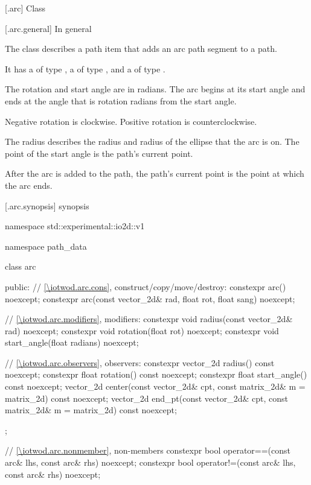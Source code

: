  [\iotwod.arc] {Class }

 [\iotwod.arc.general] {In general}

\pnum
{}%
The class  describes a path item that adds an arc path segment to a path.

\pnum
It has a  of type , a  of type , and a  of type .

\pnum
The rotation and start angle are in radians. The arc begins at its start angle and ends at the angle that is rotation radians from the start angle.

\pnum
\begin{note}
Negative rotation is clockwise. Positive rotation is counterclockwise.
\end{note}

\pnum
The radius describes the \xaxis radius and \yaxis radius of the ellipse that the arc is on. The point of the start angle is the path's current point.

\pnum
After the arc is added to the path, the path's current point is the point at which the arc ends.

 [\iotwod.arc.synopsis] { synopsis}

\begin{codeblock}
namespace std::experimental::io2d::v1 {
  namespace path_data {
    class arc {
    public:
      // \ref{\iotwod.arc.cons}, construct/copy/move/destroy:
      constexpr arc() noexcept;
      constexpr arc(const vector_2d& rad,
        float rot, float sang) noexcept;

      // \ref{\iotwod.arc.modifiers}, modifiers:
      constexpr void radius(const vector_2d& rad) noexcept;
      constexpr void rotation(float rot) noexcept;
      constexpr void start_angle(float radians) noexcept;

      // \ref{\iotwod.arc.observers}, observers:
      constexpr vector_2d radius() const noexcept;
      constexpr float rotation() const noexcept;
      constexpr float start_angle() const noexcept;
      vector_2d center(const vector_2d& cpt, const matrix_2d& m = matrix_2d{}) 
        const noexcept;
      vector_2d end_pt(const vector_2d& cpt, const matrix_2d& m = matrix_2d{}) 
        const noexcept;
    };
    
    // \ref{\iotwod.arc.nonmember}, non-members
    constexpr bool operator==(const arc& lhs, const arc& rhs) noexcept;
    constexpr bool operator!=(const arc& lhs, const arc& rhs) noexcept;
  }
}
\end{codeblock}

